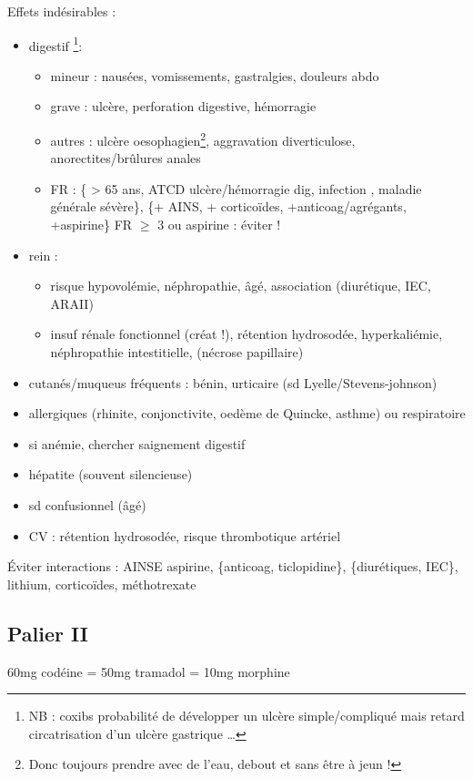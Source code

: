 \documentclass[11pt]{article}
\begin{document}
Effets indésirables :
\begin{itemize}
\item digestif \footnote{NB : coxibs \dec probabilité de développer un ulcère simple/compliqué
mais retard circatrisation d'un ulcère gastrique \ldots{}}: 
\begin{itemize}
\item mineur : nausées, vomissements, gastralgies, douleurs abdo
\item grave : ulcère, perforation digestive, hémorragie
\item autres : ulcère oesophagien\footnote{Donc toujours prendre avec de l'eau, debout et sans être à jeun !}, aggravation diverticulose,
anorectites/brûlures anales
\item FR : \{ > 65 ans, ATCD ulcère/hémorragie dig, infection ,
maladie générale sévère\}, \{+ AINS, + corticoïdes, +anticoag/agrégants,
+aspirine\}
\thus FR \(\ge\) 3 ou aspirine : éviter !
\end{itemize}
\item rein :
\begin{itemize}
\item \danger risque hypovolémie, néphropathie, âgé, association (diurétique, IEC,
ARAII)
\item insuf rénale fonctionnel (créat !), rétention hydrosodée, hyperkaliémie,
néphropathie intestitielle, (nécrose papillaire)
\end{itemize}
\item cutanés/muqueus fréquents : bénin, urticaire (sd Lyelle/Stevens-johnson)
\item allergiques (rhinite, conjonctivite, oedème de Quincke, asthme) ou respiratoire
\item si anémie, chercher saignement digestif
\item hépatite (souvent silencieuse)
\item sd confusionnel (âgé)
\item CV : rétention hydrosodée, \inc risque thrombotique artériel
\end{itemize}

Éviter interactions : AINSE aspirine, \{anticoag, ticlopidine\}, \{diurétiques,
IEC\}, lithium, corticoïdes, méthotrexate


\subsection{Palier II}
\label{sec:org452bfbc}
60mg codéine = 50mg tramadol = 10mg morphine
\end{document}
